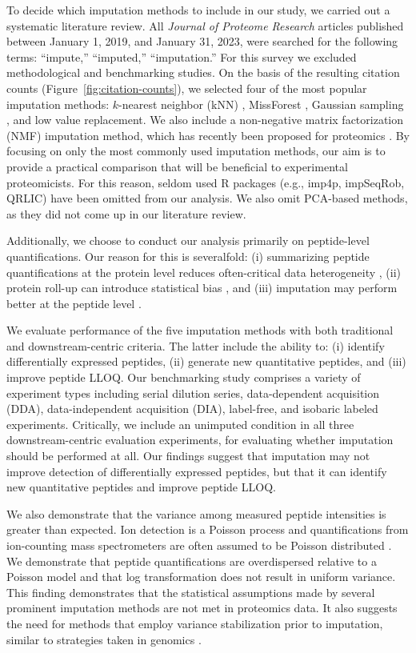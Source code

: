 \documentclass{article}
\begin{document}
To decide which imputation methods to include in our study, we carried out a systematic literature review.  All \textit{Journal of Proteome Research} articles published between January 1, 2019, and January 31, 2023, were searched for the following terms: ``impute,'' ``imputed,'' ``imputation.'' For this survey we excluded methodological and benchmarking studies.  On the basis of the resulting citation counts (Figure~\ref{fig:citation-counts}), we selected four of the most popular imputation methods: $k$-nearest neighbor (kNN)  \cite{knn-impute}, MissForest \cite{missForest}, Gaussian sampling \cite{Perseus}, and low value replacement.   We also include a non-negative matrix factorization (NMF) imputation method, which has recently been proposed for proteomics \cite{nmf-metabolomics, ms-impute, deep-impute}.  By focusing on only the most commonly used imputation methods, our aim is to provide a practical comparison that will be beneficial to experimental proteomicists. For this reason, seldom used R packages (e.g., imp4p, impSeqRob, QRLIC) have been omitted from our analysis. We also omit PCA-based methods, as they did not come up in our literature review.

Additionally, we choose to conduct our analysis primarily on peptide-level quantifications. Our reason for this is severalfold: (i) summarizing peptide quantifications at the protein level reduces often-critical data heterogeneity \cite{humpty-dumpty}, (ii) protein roll-up can introduce statistical bias \cite{boekweg-2023}, and (iii) imputation may perform better at the peptide level \cite{lazar}.

We evaluate performance of the five imputation methods with both traditional and downstream-centric criteria. The latter include the ability to: (i) identify differentially expressed peptides, (ii) generate new quantitative peptides, and (iii) improve peptide LLOQ. Our benchmarking study comprises a variety of experiment types including serial dilution series, data-dependent acquisition (DDA), data-independent acquisition (DIA), label-free, and isobaric labeled experiments. Critically, we include an unimputed condition in all three downstream-centric evaluation experiments, for evaluating whether imputation should be performed at all. Our findings suggest that imputation may not improve detection of differentially expressed peptides, but that it can identify new quantitative peptides and improve peptide LLOQ.

We also demonstrate that the variance among measured peptide intensities is greater than expected. Ion detection is a Poisson process and quantifications from ion-counting mass spectrometers are often assumed to be Poisson distributed \cite{ms-dist-derivation, stat-theory-lcms}. We demonstrate that peptide quantifications are overdispersed relative to a Poisson model and that log transformation does not result in uniform variance. This finding demonstrates that the statistical assumptions made by several prominent imputation methods are not met in proteomics data. It also suggests the need for methods that employ variance stabilization prior to imputation, similar to strategies taken in genomics \cite{variance-stable, ZINB, neg-binom-scRNAseq}.
\end{document}
